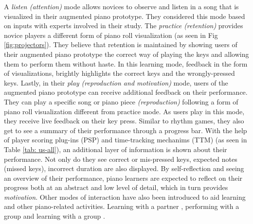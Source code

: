 \documentclass[sigconf, screen, review]{acmart}
\begin{document}
A \textit{listen (attention)} mode allows novices to observe and listen in a song that is visualized in their augmented piano prototype. They considered this mode based on inputs with experts involved in their study. The \textit{practice (retention)} provides novice players a different form of piano roll visualization (as seen in Fig \ref{fig:projectors}). They believe that retention is maintained by showing users of their augmented piano prototype the correct way of playing the keys and allowing them to perform them without haste. In this learning mode, feedback in the form of visualizations, brightly highlights the correct keys and the wrongly-pressed keys. Lastly, in their \textit{play (reproduction and motivation)} mode, users of the augmented piano prototype can receive additional feedback on their performance. They can play a specific song or piano piece \textit{(reproduction)} following a form of piano roll visualization different from practice mode. As users play in this mode, they receive live feedback on their key press. Similar to rhythm games, they also get to see a summary of their performance through a progress bar. With the help of player scoring plug-ins (PSP) and time-tracking mechanims (TTM) (as seen in Table \ref{tab: us-all}), an additional layer of information is shown about their performance. Not only do they see correct or mis-pressed keys, expected notes (missed keys), incorrect duration are also displayed. By self-reflection and seeing an overview of their performance, piano learners are expected to reflect on their progress both at an abstract and low level of detail, which in turn provides \textit{motivation}. Other modes of interaction have also been introduced to aid learning and other piano-related activities. Learning with a partner \cite{xiao2011duet}, performing with a group \cite{gerry2019adept} and learning with a group \cite{cai2019designa}.

\end{document}
